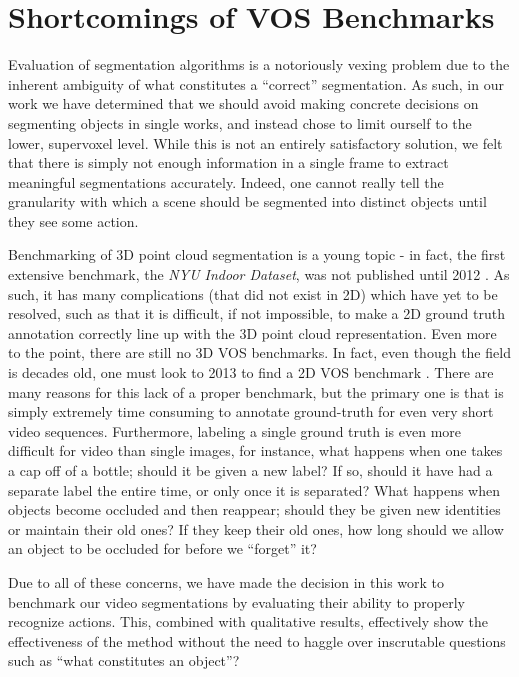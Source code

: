 \section{Shortcomings of VOS Benchmarks}
Evaluation of segmentation algorithms is a notoriously vexing problem due to the inherent ambiguity of what constitutes a ``correct'' segmentation. As such, in our work we have determined that we should avoid making concrete decisions on segmenting objects in single works, and instead chose to limit ourself to the lower, supervoxel level. While this is not an entirely satisfactory solution, we felt that there is simply not enough information in a single frame to extract meaningful segmentations accurately. Indeed, one cannot really tell the granularity with which a scene should be segmented into distinct objects until they see some action.

Benchmarking of 3D point cloud segmentation is a young topic - in fact, the first extensive benchmark, the \textit{NYU Indoor Dataset}, was not published until 2012 \cite{Silberman:ECCV12}. As such, it has many complications (that did not exist in 2D) which have yet to be resolved, such as that it is difficult, if not impossible, to make a 2D ground truth annotation correctly line up with the 3D point cloud representation. Even more to the point, there are still no 3D VOS benchmarks. In fact, even though the field is decades old, one must look to 2013 to find a 2D VOS benchmark \cite{Galasso2013}. There are many reasons for this lack of a proper benchmark, but the primary one is that is simply extremely time consuming to annotate ground-truth for even very short video sequences. Furthermore, labeling a single ground truth is even more difficult for video than single images, for instance, what happens when one takes a cap off of a bottle; should it be given a new label? If so, should it have had a separate label the entire time, or only once it is separated? What happens when objects become occluded and then reappear; should they be given new identities or maintain their old ones? If they keep their old ones, how long should we allow an object to be occluded for before we ``forget'' it?

Due to all of these concerns, we have made the decision in this work to benchmark our video segmentations by evaluating their ability to properly recognize actions. This, combined with qualitative results, effectively show the effectiveness of the method without the need to haggle over inscrutable questions such as ``what constitutes an object''?


